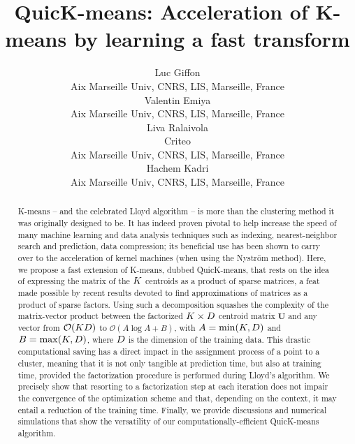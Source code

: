 \documentclass{article}
\title{QuicK-means: Acceleration of K-means by learning a fast transform}
\author{%
  Luc Giffon\\%
Aix Marseille Univ, CNRS, LIS, Marseille, France\\
   \And
   Valentin Emiya\\
Aix Marseille Univ, CNRS, LIS, Marseille, France\\
   \And
   Liva Ralaivola\\
  Criteo\\
  Aix Marseille Univ, CNRS, LIS, Marseille, France\\
   \And
   Hachem Kadri\\
Aix Marseille Univ, CNRS, LIS, Marseille, France\\
}
\begin{document}
\maketitle

\begin{abstract}
	
	K-means -- and the celebrated Lloyd algorithm -- is more than the clustering method it was originally designed to be. 
	It has indeed proven pivotal to help increase the speed of many machine learning and data analysis techniques such as indexing, nearest-neighbor search and prediction, data compression; its beneficial use has been shown to carry over to the acceleration of kernel machines (when using the Nyström method). 
	Here, we propose a fast extension of K-means, dubbed QuicK-means, that rests on the idea of expressing the matrix of the $K$ centroids as a product of sparse matrices, a feat made possible by recent results devoted to find approximations of matrices as a product of sparse factors. Using such a decomposition squashes the complexity of the matrix-vector product between the factorized $K \times D$ centroid matrix $\mathbf{U}$ and any vector from $\mathcal{O}(K D)$ to $\mathcal{O}(A \log A+B)$, with $A=\min (K, D)$ and $B=\max (K, D)$, where $D$ is the dimension of the training data. This drastic computational saving has a direct impact in the assignment process of a point to a cluster, meaning that it is not only tangible at prediction time, but also at training time, provided the factorization procedure is performed during Lloyd's algorithm. We precisely show that resorting to a factorization step at each iteration does not impair the convergence of the optimization scheme and that, depending on the context, it may entail a reduction of the training time. Finally, we provide discussions and numerical simulations that show the versatility of our computationally-efficient QuicK-means algorithm. 
	

\end{abstract}
\end{document}
